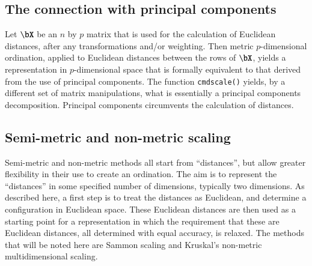 \documentclass{tufte-book}\usepackage[]{graphicx}\usepackage[]{color}
\newcommand{\txtt}[1]{\texttt{#1}}
\begin{document}
\subsection*{The connection with principal components}
Let $\bX$ be an $n$ by $p$ matrix that is used for the calculation of
Euclidean distances, after any transformations and/or weighting.
Then metric $p$-dimensional ordination, applied to Euclidean distances
between the rows of $\bX$, yields a representation in $p$-dimensional
space that is formally equivalent to that derived from the use of
principal components.  The function \txtt{cmdscale()} yields, by a
different set of matrix manipulations, what is essentially a principal
components decomposition.  Principal components circumvents the
calculation of distances.

\subsection*{Semi-metric and non-metric scaling}

Semi-metric and non-metric methods all start from ``distances'', but
allow greater flexibility in their use to create an ordination. The
aim is to represent the ``distances'' in some specified number of
dimensions, typically two dimensions.  As described here, a first step
is to treat the distances as Euclidean, and determine a configuration
in Euclidean space.  These Euclidean distances are then used as a
starting point for a representation in which the requirement that
these are Euclidean distances, all determined with equal accuracy, is
relaxed.  The methods that will be noted here are Sammon scaling and
Kruskal's non-metric multidimensional scaling.
\end{document}
